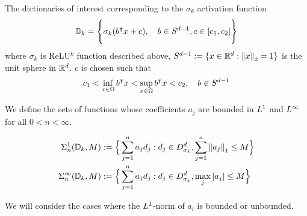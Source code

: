 
The dictionaries of interest corresponding to the $\sigma_k$ activation function
\begin{equation}
    \mathbb{D}_{k} = \Bigg\{
        \sigma_k(b{}^{\intercal} x + c), \quad b\in S^{d-1}, c\in [c_1, c_2] 
    \Bigg\}
\end{equation}
where $\sigma_k$ is ReLU$^k$ function described above, $S^{d-1} := \{x\in\mathbb{R}^d:
\left\| x \right\|_2 = 1\}$ is the unit sphere in $\mathbb{R}^d$. $c$ is chosen such that
\begin{equation}
    c_1 < \inf_{x\in\Omega} b{}^{\intercal} x < 
    \sup_{x\in\Omega} b{}^{\intercal} x < c_2, \quad
    b \in S^{d-1}
\end{equation}

We define the sets of functions whose coefficients $a_j$ are bounded in $L^{1}$
and $L^{\infty}$ for all $0 < n < \infty$.

\begin{align*}
    \Sigma_n^1(\mathbb{D}_k, M) &:= \Big\{
        \sum_{j=1}^n a_j d_j:
        d_j \in D^d_{\sigma_k}, \sum_{j=1}^n \left\| a_j \right\|_1 \leq M 
    \Big\} \\
    \Sigma_n^{\infty}(\mathbb{D}_k, M) &:= \Big\{
        \sum_{j=1}^n a_j d_j:
        d_j \in D^d_{\sigma_k}, \max_{j} \left| a_j \right| \leq M 
    \Big\}
\end{align*}

We will consider the cases where the $L^{1}$-norm of $a_i$ is bounded or
unbounded.







